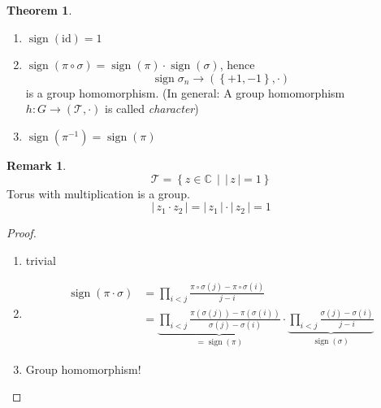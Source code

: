 \documentclass[a4paper,landscape,twocolumn]{article}
\newcommand\abs[1]{|\,#1\,|}
\newcommand\set[1]{\left\{#1\right\}}
\newcommand\setdef[2]{\left\{#1\,\middle|\,#2\right\}}
\theoremstyle{definition}
\newtheorem{theorem}{Theorem}
\newtheorem{rem}{Remark}
\DeclareMathOperator\sign{sign}
\begin{document}
\begin{theorem}
  \begin{enumerate}
    \item $\sign(\text{id}) = 1$
    \item $\sign(\pi \circ \sigma) = \sign(\pi) \cdot \sign(\sigma)$, hence
      \[ \sign{\sigma_n} \to (\set{+1, -1}, \cdot) \]
      is a group homomorphism.
      (In general: A group homomorphism $h: G \to (\mathcal T, \cdot)$ is called \emph{character})
    \item $\sign(\pi^{-1}) = \sign(\pi)$
  \end{enumerate}
\end{theorem}
\begin{rem}
  \[ \mathcal T = \setdef{z \in \mathbb C}{\abs{z} = 1} \]
  Torus with multiplication is a group.
  \[ \abs{z_1 \cdot z_2} = \abs{z_1} \cdot \abs{z_2} = 1 \]
\end{rem}
\begin{proof}
  \begin{enumerate}
    \item trivial
    \item
      \begin{align*}
        \sign(\pi \cdot \sigma) &= \prod_{i<j} \frac{\pi \circ \sigma(j) - \pi \circ \sigma(i)}{j - i} \\
          &= \underbrace{\prod_{i<j} \frac{\pi(\sigma(j)) - \pi(\sigma(i))}{\sigma(j) - \sigma(i)}}_{=\sign(\pi)}
             \cdot \underbrace{\prod_{i < j} \frac{\sigma(j) - \sigma(i)}{j - i}}_{\sign(\sigma)}
      \end{align*}
    \item Group homomorphism!
  \end{enumerate}
\end{proof}
\end{document}
